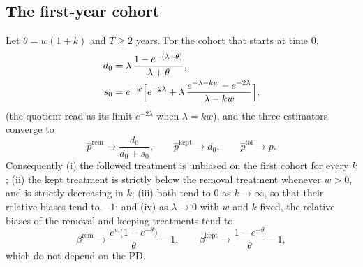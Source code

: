\subsection{The first-year cohort}
\label{sec:theory-first-year}

\begin{proposition}\label{prop:first-year}
Let $\theta=w(1+k)$ and $T\ge2$ years. For the cohort that starts at time $0$,
\begin{align}
d_0&=\lambda\,\frac{1-e^{-(\lambda+\theta)}}{\lambda+\theta},\label{eq:d0}\\
s_0&=e^{-w}\Bigl[e^{-2\lambda}+\lambda\,\frac{e^{-\lambda-kw}-e^{-2\lambda}}{\lambda-kw}\Bigr],\label{eq:s0}
\end{align}
(the quotient read as its limit $e^{-2\lambda}$ when $\lambda=kw$), and the three estimators converge to
\begin{equation}
\hat p^{\mathrm{rem}}\to\frac{d_0}{d_0+s_0},\qquad \hat p^{\mathrm{kept}}\to d_0,\qquad \hat p^{\mathrm{fol}}\to p.
\label{eq:first-year-limits}
\end{equation}
Consequently (i) the followed treatment is unbiased on the first cohort for every $k$; (ii) the kept treatment is strictly below the removal treatment whenever $w>0$, and is strictly decreasing in $k$; (iii) both tend to $0$ as $k\to\infty$, so that their relative biases tend to $-1$; and (iv) as $\lambda\to0$ with $w$ and $k$ fixed, the relative biases of the removal and keeping treatments tend to
\begin{equation}
\beta^{\mathrm{rem}}\to\frac{e^{w}\bigl(1-e^{-\theta}\bigr)}{\theta}-1,\qquad
\beta^{\mathrm{kept}}\to\frac{1-e^{-\theta}}{\theta}-1,
\label{eq:first-order}
\end{equation}
which do not depend on the PD.
\end{proposition}

